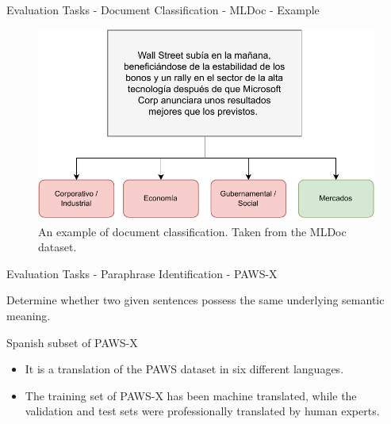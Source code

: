 \documentclass[aspectratio=169,xcolor=dvipsnames]{beamer}
\newenvironment{wideitemize}{\itemize\addtolength{\itemsep}{10pt}}{\enditemize}
\begin{document}
\begin{frame}{Evaluation Tasks - Document Classification - MLDoc - Example}

\centering
\begin{figure}
    \includegraphics[scale=0.65]{images/nlp-example-document-classification.pdf}
    \caption{An example of document classification. Taken from the MLDoc \citep{schwenk-li-2018-corpus} dataset.}
    \label{fig:nlp-example-document-classification}
\end{figure}

\end{frame}
\begin{frame}{Evaluation Tasks - Paraphrase Identification - PAWS-X}

\begin{wideitemize}
    \item Determine whether two given sentences possess the same underlying semantic meaning.
    \item Spanish subset of PAWS-X \citep{yang-etal-2019-paws}
    \begin{itemize}
        \item It is a translation of the PAWS \citep{zhang-etal-2019-paws} dataset in six different languages.
        \item The training set of PAWS-X has been machine translated, while the validation and test sets were professionally translated by human experts.
    \end{itemize}
\end{wideitemize}

\end{frame}
\end{document}
